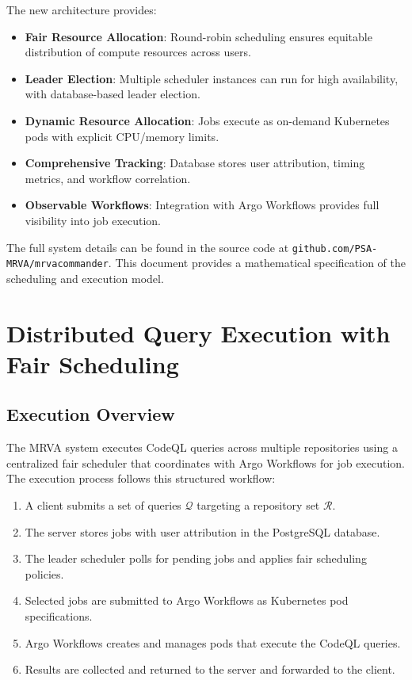\documentclass[11pt]{article}
\begin{document}
The new architecture provides:

\begin{itemize}
\item \textbf{Fair Resource Allocation}: Round-robin scheduling ensures equitable distribution of compute resources across users.
\item \textbf{Leader Election}: Multiple scheduler instances can run for high availability, with database-based leader election.
\item \textbf{Dynamic Resource Allocation}: Jobs execute as on-demand Kubernetes pods with explicit CPU/memory limits.
\item \textbf{Comprehensive Tracking}: Database stores user attribution, timing metrics, and workflow correlation.
\item \textbf{Observable Workflows}: Integration with Argo Workflows provides full visibility into job execution.
\end{itemize}

The full system details can be found in the source code at \texttt{github.com/PSA-MRVA/mrvacommander}. This document provides a mathematical specification of the scheduling and execution model.

\section{Distributed Query Execution with Fair Scheduling}

\subsection{Execution Overview}

The MRVA system executes CodeQL queries across multiple repositories using a centralized fair scheduler that coordinates with Argo Workflows for job execution. The execution process follows this structured workflow:

\begin{enumerate}
\item A client submits a set of queries $\mathcal{Q}$ targeting a repository set $\mathcal{R}$.
\item The server stores jobs with user attribution in the PostgreSQL database.
\item The leader scheduler polls for pending jobs and applies fair scheduling policies.
\item Selected jobs are submitted to Argo Workflows as Kubernetes pod specifications.
\item Argo Workflows creates and manages pods that execute the CodeQL queries.
\item Results are collected and returned to the server and forwarded to the client.
\end{enumerate}
\end{document}
